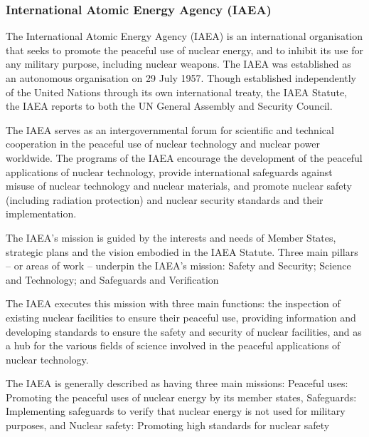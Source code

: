 \documentclass[twoside,titlepage,11pt,twocolumn,a4paper]{article}
\begin{document}
\subsubsection{International Atomic Energy Agency (IAEA)}
The International Atomic Energy Agency (IAEA) is an international
organisation that seeks to promote the peaceful use of nuclear energy,
and to inhibit its use for any military purpose, including nuclear
weapons. The IAEA was established as an autonomous organisation on 29
July 1957. Though established independently of the United
Nations through its own international treaty, the IAEA Statute, the
IAEA reports to both the UN General Assembly and Security Council.

The IAEA serves as an intergovernmental forum for scientific and
technical cooperation in the peaceful use of nuclear
technology and nuclear power worldwide.  The programs of the IAEA
encourage the development of the peaceful applications of nuclear
technology, provide international safeguards against misuse of nuclear
technology and nuclear materials, and promote nuclear
safety (including radiation protection) and nuclear security standards
and their implementation.

The IAEA's mission is guided by the interests and needs of Member
States, strategic plans and the vision embodied in the IAEA
Statute. Three main pillars -- or areas of work -- underpin the IAEA's
mission: Safety and Security; Science and Technology; and Safeguards
and Verification

The IAEA executes this mission with three main functions: the
inspection of existing nuclear facilities to ensure their peaceful
use, providing information and developing standards to ensure the
safety and security of nuclear facilities, and as a hub for the
various fields of science involved in the peaceful applications of
nuclear technology.

The IAEA is generally described as having three main missions:
Peaceful uses: Promoting the peaceful uses of nuclear energy by its
member states, Safeguards: Implementing safeguards to verify that
nuclear energy is not used for military purposes, and Nuclear safety:
Promoting high standards for nuclear safety
\end{document}
